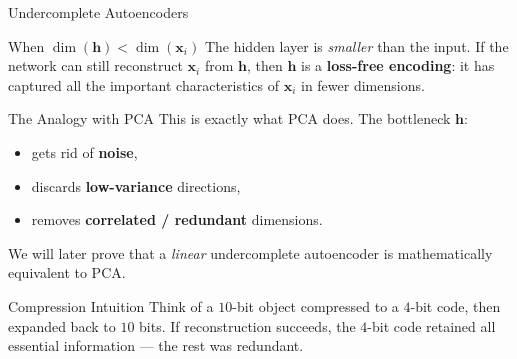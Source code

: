 \documentclass{beamer}
\begin{document}
\begin{frame}[shrink=10]{Undercomplete Autoencoders}
  \begin{block}{When $\dim(\mathbf{h}) < \dim(\mathbf{x}_i)$}
    The hidden layer is \emph{smaller} than the input. If the network can
    still reconstruct $\mathbf{x}_i$ from $\mathbf{h}$, then $\mathbf{h}$
    is a \textbf{loss-free encoding}: it has captured all the important
    characteristics of $\mathbf{x}_i$ in fewer dimensions.
  \end{block}

  \begin{exampleblock}{The Analogy with PCA}
    This is exactly what PCA does. The bottleneck $\mathbf{h}$:
    \begin{itemize}\setlength\itemsep{3pt}
      \item gets rid of \textbf{noise},
      \item discards \textbf{low-variance} directions,
      \item removes \textbf{correlated / redundant} dimensions.
    \end{itemize}
    We will later prove that a \emph{linear} undercomplete autoencoder is
    mathematically equivalent to PCA.
  \end{exampleblock}

  \begin{block}{Compression Intuition}
    Think of a $10$-bit object compressed to a $4$-bit code, then expanded
    back to $10$ bits. If reconstruction succeeds, the $4$-bit code retained
    all essential information --- the rest was redundant.
  \end{block}
\end{frame}
\end{document}
